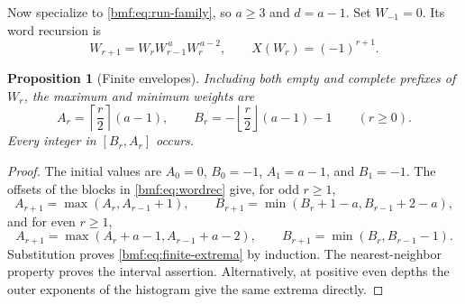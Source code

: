 \documentclass[11pt]{article}
\numberwithin{equation}{section}
\newtheorem{proposition}[theorem]{Proposition}
\theoremstyle{definition}
\theoremstyle{remark}
\begin{document}
Now specialize to \eqref{bmf:eq:run-family}, so $a\geq3$ and
$d=a-1$. Set $W_{-1}=0$. Its word recursion is
\begin{equation}\label{bmf:eq:wordrec}
 W_{r+1}=W_rW_{r-1}^{\,a}W_r^{\,a-2},\qquad
 X(W_r)=(-1)^{r+1}.
\end{equation}

\begin{proposition}[Finite envelopes]\label{bmf:prop:finite-extrema}
Including both empty and complete prefixes of $W_r$, the maximum
and minimum weights are
\begin{equation}\label{bmf:eq:finite-extrema}
 A_r=\left\lceil\frac r2\right\rceil(a-1),\qquad
 B_r=-\left\lfloor\frac r2\right\rfloor(a-1)-1
 \qquad(r\geq0).
\end{equation}
Every integer in $[B_r,A_r]$ occurs.
\end{proposition}
\begin{proof}
The initial values are $A_0=0$, $B_0=-1$,
$A_1=a-1$, and $B_1=-1$.
The offsets of the blocks in \eqref{bmf:eq:wordrec} give, for odd
$r\geq1$,
\[
 A_{r+1}=\max(A_r,A_{r-1}+1),\qquad
 B_{r+1}=\min(B_r+1-a,B_{r-1}+2-a),
\]
and for even $r\geq1$,
\[
 A_{r+1}=\max(A_r+a-1,A_{r-1}+a-2),\qquad
 B_{r+1}=\min(B_r,B_{r-1}-1).
\]
Substitution proves \eqref{bmf:eq:finite-extrema} by induction.
The nearest-neighbor property proves the interval assertion.
Alternatively, at positive even depths the outer exponents of
the histogram give the same extrema directly.
\end{proof}
\end{document}
